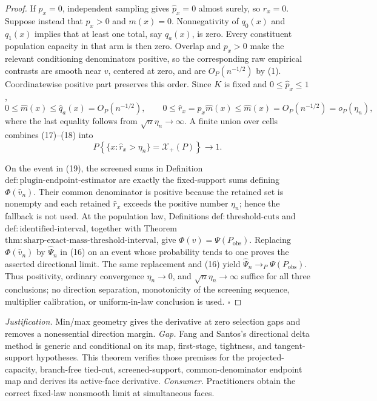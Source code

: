 \documentclass{article}
\begin{document}
\begin{proof}
If \(p_x=0\), independent sampling gives \(\widehat p_x=0\) almost
surely, so \(\widehat r_x=0\).  Suppose instead that \(p_x>0\) and
\(m(x)=0\).  Nonnegativity of \(q_0(x)\) and \(q_1(x)\) implies that at
least one total, say \(q_a(x)\), is zero.  Every constituent population
capacity in that arm is then zero.  Overlap and \(p_x>0\) make the
relevant conditioning denominators positive, so the corresponding raw
empirical contrasts are smooth near \(v\), centered at zero, and are
\(O_P(n^{-1/2})\) by (1).  Coordinatewise positive part preserves this
order.  Since \(K\) is fixed and \(0\le\widehat p_x\le1\),
\[
0\le\widehat m(x)\le\widehat q_a(x)=O_P(n^{-1/2}),
\qquad
0\le\widehat r_x=\widehat p_x\widehat m(x)
\le\widehat m(x)=O_P(n^{-1/2})=o_P(\eta_n),
\tag{18}
\]
where the last equality follows from
\(\sqrt n\eta_n\to\infty\).  A finite union over cells combines
(17)--(18) into
\[
P\!\left\{\{x:\widehat r_x>\eta_n\}=\mathcal X_+(P)\right\}
\longrightarrow1.
\tag{19}
\]

On the event in (19), the screened sums in Definition
\(\mathrm{def{:}plugin\text{-}endpoint\text{-}estimator}\) are exactly
the fixed-support sums defining \(\Phi(\widehat v_n)\).  Their common
denominator is positive because the retained set is nonempty and each
retained \(\widehat r_x\) exceeds the positive number \(\eta_n\); hence
the fallback is not used.  At the population law, Definitions
\(\mathrm{def{:}threshold\text{-}cuts}\) and
\(\mathrm{def{:}identified\text{-}interval}\), together with Theorem
\(\mathrm{thm{:}sharp\text{-}exact\text{-}mass\text{-}threshold\text{-}interval}\),
give \(\Phi(v)=\Psi(P_{\mathrm{obs}})\).  Replacing
\(\Phi(\widehat v_n)\) by \(\widehat\Psi_n\) in (16) on an event whose
probability tends to one proves the asserted directional limit.  The same
replacement and (16) yield
\(\widehat\Psi_n\to_P\Psi(P_{\mathrm{obs}})\).  Thus positivity,
ordinary convergence \(\eta_n\to0\), and
\(\sqrt n\eta_n\to\infty\) suffice for all three conclusions; no
direction separation, monotonicity of the screening sequence,
multiplier calibration, or uniform-in-law conclusion is used.
\(\square\)
\end{proof}
\par\smallskip\noindent \textit{Justification.} Min/max geometry gives the derivative at zero selection gaps and removes a nonessential direction margin. \textit{Gap.} Fang and Santos's directional delta method is generic and conditional on its map, first-stage, tightness, and tangent-support hypotheses. This theorem verifies those premises for the projected-capacity, branch-free tied-cut, screened-support, common-denominator endpoint map and derives its active-face derivative. \textit{Consumer.} Practitioners obtain the correct fixed-law nonsmooth limit at simultaneous faces.
\end{document}
